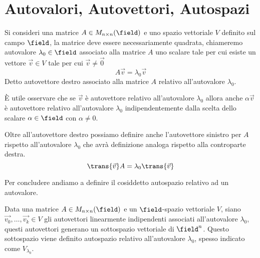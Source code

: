 \section{Autovalori, Autovettori, Autospazi}
Si consideri una matrice $A \in M_{n \times n}(\field)$ e uno spazio vettoriale $V$ definito sul campo $\field$, la matrice deve essere necessariamente quadrata, chiameremo autovalore $\lambda_0 \in \field$ associato alla matrice $A$ uno scalare tale per cui esiste un vettore $\vec{v} \in V$ tale per cui $\vec{v} \neq \vec{0}$
\begin{equation}
    A\vec{v} = \lambda_0\vec{v}
\end{equation}
Detto autovettore destro associato alla matrice $A$ relativo all'autovalore $\lambda_0$.

È utile osservare che se $\vec{v}$ è autovettore relativo all'autovalore $\lambda_0$ allora anche $\alpha\vec{v}$ è autovettore relativo all'autovalore $\lambda_0$ indipendentemente dalla scelta dello scalare $\alpha \in \field$ con $\alpha \neq 0$.

Oltre all'autovettore destro possiamo definire anche l'autovettore sinistro per $A$ rispetto all'autovalore $\lambda_0$ che avrà definizione analoga rispetto alla controparte destra.
\begin{equation}
    \trans{\vec{v}}A = \lambda_0\trans{\vec{v}}
\end{equation}

Per concludere andiamo a definire il cosiddetto autospazio relativo ad un autovalore.
\begin{definition}
    Data una matrice $A \in M_{n \times n}(\field)$ e un $\field$-spazio vettoriale $V$, siano $\vec{v_0}, \dots, \vec{v_k} \in V$ gli autovettori linearmente indipendenti associati all'autovalore $\lambda_0$, questi autovettori generano un sottospazio vettoriale di $\field^n$. Questo sottospazio viene definito autospazio relativo all'autovalore $\lambda_0$, spesso indicato come $V_{\lambda_0}$.
\end{definition}